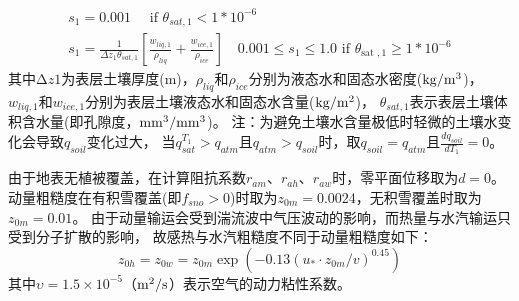 \begin{equation}
\begin{array}{c}s_{1}=0.001 \quad \text { if } \theta_{{sat }, 1}<1 * 10^{-6} \\ s_{1}=\frac{1}{\Delta z_{1} \theta_{{sat }, 1}}\left[\frac{w_{l i q, 1}}{\rho_{l i q}}+\frac{w_{i c e, 1}}{\rho_{{ice }}}\right] \quad 0.001 \leq s_{1} \leq 1.0 \text { if } \theta_{\text {sat }, 1} \geq 1 * 10^{-6}\end{array}
\end{equation}
其中$∆z1$为表层土壤厚度(m)，$\rho_{liq}$和$\rho_{ice}$分别为液态水和固态水密度($\rm kg/m^3$)，
$w_{liq,1}$和$w_{ice,1}$分别为表层土壤液态水和固态水含量($\rm kg/m^2$)，
$\theta_{sat,1}$表示表层土壤体积含水量(即孔隙度，$\rm mm^3/mm^3$)。
注：为避免土壤水含量极低时轻微的土壤水变化会导致$q_{soil}$变化过大，
当$q_{sat}^{T_1}>q_{atm}$且$q_{atm}>q_{soil}$时，取$q_{soil}=q_{atm}$且$\frac{dq_{soil}}{dT_1}=0$。


由于地表无植被覆盖，在计算阻抗系数$r_{am}$、$r_{ah}$、$r_{aw}$时，零平面位移取为$d=0$。
动量粗糙度在有积雪覆盖(即$f_{sno}>0$)时取为$z_{0m}=0.0024$，无积雪覆盖时取为$z_{0m}=0.01$。
由于动量输运会受到湍流波中气压波动的影响，而热量与水汽输运只受到分子扩散的影响，
故感热与水汽粗糙度不同于动量粗糙度如下\citep{zeng1998effect}：
\begin{equation}
z_{0 h}=z_{0 w}=z_{0 m} \exp \left(-0.13\left(u_{*} \cdot z_{0 m} / v\right)^{0.45}\right)
\end{equation}
其中$\upsilon=1.5\times{10}^{-5}$（$\rm m^2/s$）表示空气的动力粘性系数。


